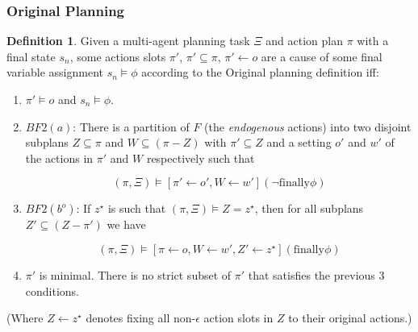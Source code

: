 \documentclass{article}
\theoremstyle{plain}
\theoremstyle{definition}
\newtheorem{defn}[thm]{Definition} %
\begin{document}
\subsubsection*{Original Planning} \label{sec:originalPlanning}
\begin{defn}
Given a multi-agent planning task $\Xi$ and action plan $\pi$ with a final state $s_n$, some actions slots $\pi'$, $\pi' \subseteq \pi$, $\pi' \leftarrow o$ are a cause of some final variable assignment $s_n \models \phi$ according to the Original planning definition iff:
\begin{enumerate}
\item  $\pi' \models o$ and $s_n \models \phi$.



\item $BF2(a)$: There is a partition of $F$ (the \textit{endogenous} actions) into two disjoint subplans $Z \subseteq \pi$ and $W \subseteq (\pi - Z)$ with $\pi' \subseteq Z$ and a setting $o'$ and $w'$ of the actions in $\pi'$ and $W$ respectively such that

\[
(\pi, \Xi) \models [\pi' \leftarrow o', W \leftarrow w'](\lnot \textrm{finally} \phi)
\]

\item $BF2(b^o)$: If $z^\star$ is such that $(\pi, \Xi) \models Z = z^\star$, then for all subplans $Z' \subseteq (Z - \pi')$ we have

\[
(\pi, \Xi) \models [\pi \leftarrow o, W \leftarrow w', Z' \leftarrow z^\star](\textrm{finally} \phi)
\]

\item $\pi'$ is minimal. There is no strict subset of $\pi'$ that satisfies the previous 3 conditions.
\end{enumerate}
\end{defn}

(Where $Z\leftarrow z^\star$ denotes fixing all non-$\epsilon$ action slots in $Z$ to their original actions.)
\end{document}
